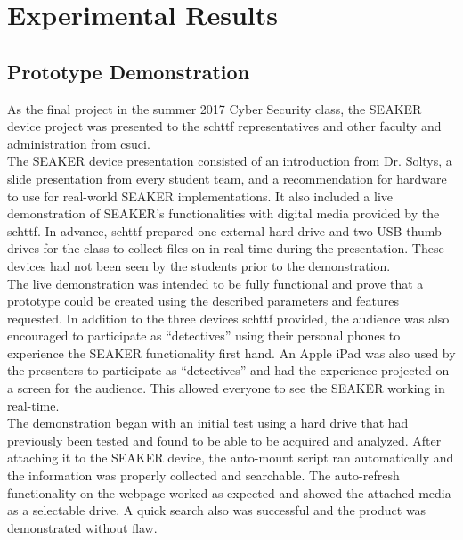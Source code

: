\documentclass[12pt]{article}
\begin{document}
\section{Experimental Results}
\label{sect-experimentalResults}

\subsection{Prototype Demonstration}

As the final project in the summer 2017 Cyber Security class, the SEAKER device
project was presented to the \gls{schttf} representatives and other faculty and
administration from \gls{csuci}.\\

The SEAKER device presentation consisted of an introduction from Dr. Soltys, a 
slide presentation from every student team, and a recommendation for hardware to 
use for real-world SEAKER implementations.  It also included a live demonstration
of SEAKER's functionalities with digital media provided by the \gls{schttf}.
In advance, \gls{schttf} prepared one external hard drive and two USB thumb drives
for the class to collect files on in real-time during the presentation.  These
devices had not been seen by the students prior to the demonstration.\\

The live demonstration was intended to be fully
functional and prove that a prototype could be created using the described
parameters and features requested.  In addition to the three devices \gls{schttf}
provided, the audience was also encouraged to participate
as ``detectives'' using their personal phones to experience the SEAKER functionality
first hand.  An Apple iPad was also used by the presenters to participate as
``detectives'' and had the experience projected on a screen for the audience.
This allowed everyone to see the SEAKER working in real-time.\\

The demonstration began with an initial test using a hard drive that had previously
been tested and found to be able to be acquired and analyzed.  After attaching it
to the SEAKER device, the auto-mount script ran automatically and the information
was properly collected and searchable.  The auto-refresh functionality on the
webpage worked as expected and showed the attached media as a selectable drive.
A quick search also was successful and the product was demonstrated without flaw.\\
\end{document}
